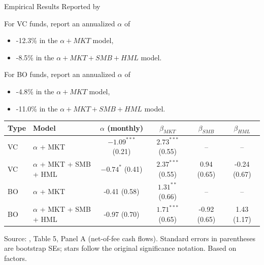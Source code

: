 \documentclass[aspectratio=169,11pt]{beamer}
\begin{document}
\begin{frame}[t]{Empirical Results Reported by \cite{DLP12}}
	
	For VC funds, \cite{DLP12} report an annualized $\alpha$ of 
	\vspace{0.25em}
	\begin{itemize}
		\item -12.3\% \hspace{0.5em} in the $\alpha+MKT$ model,
		\item -8.5\% \hspace{1em} in the $\alpha+MKT+SMB+HML$ model.
	\end{itemize}
	
	\vspace{0.5em}
	
	For BO funds, \cite{DLP12} report an annualized $\alpha$ of 
	\vspace{0.25em}
	\begin{itemize}
		\item -4.8\% \hspace{1em} in the $\alpha+MKT$ model,
		\item -11.0\% \hspace{0.6em} in the $\alpha+MKT+SMB+HML$ model.
	\end{itemize}
	
	
	\vspace{0.25em}
	
	{\small
		\begin{center}
			\setlength{\tabcolsep}{3pt}
			\begin{tabular}{llcccc}
				\toprule
				Type & Model & $\alpha$ (monthly) & $\beta_{MKT}$ & $\beta_{SMB}$ & $\beta_{HML}$ \\
				\midrule
				VC & $\alpha$ + MKT & $-1.09^{***}$ (0.21) & $2.73^{***}$ (0.55) & -- & -- \\
				VC & $\alpha$ + MKT + SMB + HML & $-0.74^{*}$ (0.41) & $2.37^{***}$ (0.55) & 0.94 (0.65) & -0.24 (0.67) \\
				BO & $\alpha$ + MKT & -0.41 (0.58) & $1.31^{**}$ (0.66) & -- & -- \\
				BO & $\alpha$ + MKT + SMB + HML & -0.97 (0.70) & $1.71^{***}$ (0.65) & -0.92 (0.65) & 1.43 (1.17) \\
				\bottomrule
			\end{tabular}
		\end{center}
	}
	
	\vspace{0.25em}
	\tiny Source: \cite{DLP12}, Table 5, Panel A (net-of-fee cash flows). Standard errors in parentheses are bootstrap SEs; stars follow the original significance notation. Based on \cite{FF15} factors.
	
\end{frame}
\end{document}
